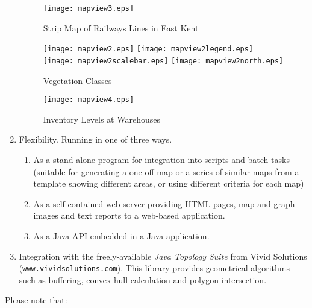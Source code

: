 \begin{enumerate}
\begin{figure}
\texttt{[image: mapview3.eps]}
\caption{Strip Map of Railways Lines in East Kent}
\label{mapview3}
\end{figure}

\begin{figure}
\texttt{[image: mapview2.eps]}
\texttt{[image: mapview2legend.eps]}
\vspace{1pt}
\texttt{[image: mapview2scalebar.eps]}
\texttt{[image: mapview2north.eps]}
\caption{Vegetation Classes}
\label{mapview2}
\end{figure}

\begin{figure}
\texttt{[image: mapview4.eps]}
\caption{Inventory Levels at Warehouses}
\label{mapview4}
\end{figure}

\item
Flexibility.  Running in one of three ways.

\begin{enumerate}
\item
As a stand-alone program for integration into
scripts and batch tasks  (suitable for generating a one-off
map or a series of similar maps from a template
showing different areas, or using different criteria for each map)

\item
As a self-contained web server providing HTML pages, map and
graph images and text reports to a web-based application.

\item
As a Java API embedded in a Java application.
\end{enumerate}

\item
Integration with the freely-available
\textit{Java Topology Suite} from Vivid Solutions
(\texttt{www.vividsolutions.com}).
This library provides geometrical algorithms
such as buffering, convex hull calculation and polygon intersection.

\end{enumerate}


Please note that:

